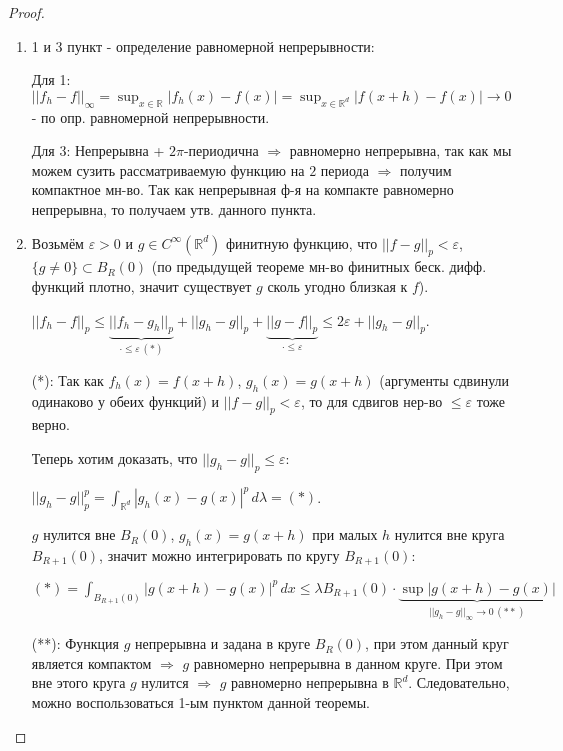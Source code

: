 \begin{proof}
    \begin{enumerate}
        \item {
            1 и 3 пункт - определение равномерной непрерывности:

            Для 1: $||f_h - f||_\infty = \sup_{x \in \mathbb{R}} |f_h(x) - f(x)| = \sup_{x \in \mathbb{R}^d} |f(x + h) - f(x)| \rightarrow 0$ - по опр. равномерной непрерывности.

            Для 3: Непрерывна + $2\pi$-периодична $\Rightarrow$ равномерно непрерывна, так как мы можем сузить рассматриваемую функцию на $2$ периода $\Rightarrow$ получим компактное мн-во. Так как непрерывная ф-я на компакте равномерно непрерывна, то получаем утв. данного пункта.
        }
        \item {
            Возьмём $\varepsilon > 0$ и $g \in C^{\infty}(\mathbb{R}^d)$ финитную функцию, что $||f - g||_p < \varepsilon$, $\{g \neq 0\} \subset B_{R}(0)$ (по предыдущей теореме мн-во финитных беск. дифф. функций плотно, значит существует $g$ сколь угодно близкая к $f$).

            $||f_h - f||_p \leqslant \underbrace{||f_h - g_h ||_p}_{\cdot \leq \varepsilon \, (*)} + ||g_h - g||_p + \underbrace{||g - f||_p}_{\cdot \leq \varepsilon} \leqslant 2\varepsilon + ||g_h - g||_p$.

            (*): Так как $f_h(x) = f(x + h)$, $g_h(x) = g(x + h)$ (аргументы сдвинули одинаково у обеих функций) и $|| f - g ||_p < \varepsilon$, то для сдвигов нер-во $\leq \varepsilon$ тоже верно.

            Теперь хотим доказать, что $||g_h - g||_p \leq \varepsilon$:

            $||g_h - g||_p^p = \int_{\mathbb{R}^d} |g_h(x) - g(x)|^p \, d\lambda = (*)$.

            $g$ нулится вне $B_R (0)$, $g_h(x) = g(x + h)$ при малых $h$ нулится вне круга $B_{R+1}(0)$, значит можно интегрировать по кругу $B_{R+1}(0)$:

            $(*) = \int_{B_{R + 1}(0)} |g(x + h) - g(x)|^p \, dx \leqslant \lambda B_{R + 1} (0) \cdot \underbrace{\sup |g(x + h) - g(x)|}_{||g_h - g||_{\infty} \rightarrow 0 \, (**)}$

            (**): Функция $g$ непрерывна и задана в круге $B_{R}(0)$, при этом данный круг является компактом $\Rightarrow$ $g$ равномерно непрерывна в данном круге. При этом вне этого круга $g$ нулится $\Rightarrow$ $g$ равномерно непрерывна в $\mathbb{R}^d$. Следовательно, можно воспользоваться 1-ым пунктом данной теоремы.
        }
    \end{enumerate}

\end{proof}
